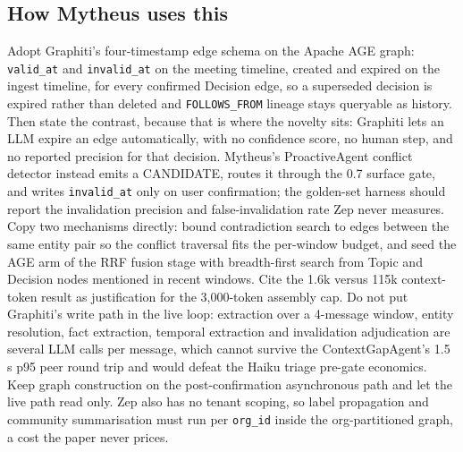 \subsection{How Mytheus uses this}
\begin{takeaway}
Adopt Graphiti's four-timestamp edge schema on the Apache AGE graph: \texttt{valid\_at} and \texttt{invalid\_at} on the meeting timeline, created and expired on the ingest timeline, for every confirmed Decision edge, so a superseded decision is expired rather than deleted and \texttt{FOLLOWS\_FROM} lineage stays queryable as history. Then state the contrast, because that is where the novelty sits: Graphiti lets an LLM expire an edge automatically, with no confidence score, no human step, and no reported precision for that decision. Mytheus's ProactiveAgent conflict detector instead emits a CANDIDATE, routes it through the 0.7 surface gate, and writes \texttt{invalid\_at} only on user confirmation; the golden-set harness should report the invalidation precision and false-invalidation rate Zep never measures. Copy two mechanisms directly: bound contradiction search to edges between the same entity pair so the conflict traversal fits the per-window budget, and seed the AGE arm of the RRF fusion stage with breadth-first search from Topic and Decision nodes mentioned in recent windows. Cite the 1.6k versus 115k context-token result as justification for the 3,000-token assembly cap. Do not put Graphiti's write path in the live loop: extraction over a 4-message window, entity resolution, fact extraction, temporal extraction and invalidation adjudication are several LLM calls per message, which cannot survive the ContextGapAgent's 1.5 s p95 peer round trip and would defeat the Haiku triage pre-gate economics. Keep graph construction on the post-confirmation asynchronous path and let the live path read only. Zep also has no tenant scoping, so label propagation and community summarisation must run per \texttt{org\_id} inside the org-partitioned graph, a cost the paper never prices.
\end{takeaway}

